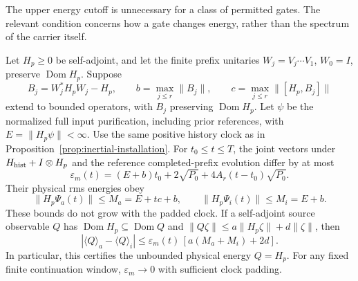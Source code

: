 The upper energy cutoff is unnecessary for a class of permitted gates.
The relevant condition concerns how a gate changes energy, rather than
the spectrum of the carrier itself.

\begin{proposition}
\label{prop:energy-regular-return}
Let $H_p\ge0$ be self-adjoint, and let the finite prefix unitaries
$W_j=V_j\cdots V_1$, $W_0=I$, preserve $\operatorname{Dom}H_p$.
Suppose
\[
 B_j=W_j^*H_pW_j-H_p,\qquad
 b=\max_{j\le r}\|B_j\|,\qquad
 c=\max_{j\le r}\|[H_p,B_j]\|
\]
extend to bounded operators, with $B_j$ preserving
$\operatorname{Dom}H_p$. Let $\psi$ be the normalized full input
purification, including prior references, with $E=\|H_p\psi\|<\infty$.
Use the same positive history clock as in
Proposition~\ref{prop:inertial-installation}. For $t_0\le t\le T$, the
joint vectors under $H_{\rm hist}+I\otimes H_p$ and the reference
completed-prefix evolution differ by at most
\begin{equation}\label{eq:energy-regular-vector}
 \varepsilon_m(t)=(E+b)t_0+2\sqrt{P_0}
                  +4A_r(t-t_0)\sqrt{P_0}.
\end{equation}
Their physical rms energies obey
\begin{equation}\label{eq:energy-regular-moments}
 \|H_p\Psi_a(t)\|\le M_a=E+tc+b,\qquad
 \|H_p\Psi_i(t)\|\le M_i=E+b.
\end{equation}
These bounds do not grow with the padded clock. If a self-adjoint
source observable $Q$ has $\operatorname{Dom}H_p\subseteq\operatorname{Dom}Q$
and $\|Q\zeta\|\le a\|H_p\zeta\|+d\|\zeta\|$, then
\begin{equation}\label{eq:energy-regular-source}
 |\langle Q\rangle_a-\langle Q\rangle_i|
 \le\varepsilon_m(t)\,[a(M_a+M_i)+2d].
\end{equation}
In particular, this certifies the unbounded physical energy $Q=H_p$.
For any fixed finite continuation window, $\varepsilon_m\to0$ with
sufficient clock padding.
\end{proposition}
